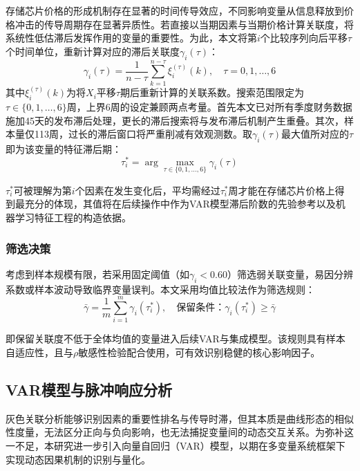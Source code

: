 \documentclass[a4paper,12pt,fontset=fandol]{ctexart}
\begin{document}
存储芯片价格的形成机制存在显著的时间传导效应，不同影响变量从信息释放到价格冲击的传导周期存在显著异质性。若直接以当期因素与当期价格计算关联度，将系统性低估滞后发挥作用的变量的重要性。为此，本文将第$i$个比较序列向后平移$\tau$个时间单位，重新计算对应的滞后关联度$\gamma_i(\tau)$：
\begin{equation}
\gamma_i(\tau) = \frac{1}{n-\tau}\sum_{k=1}^{n-\tau}\xi_i^{(\tau)}(k),\quad \tau=0,1,\ldots,6
\end{equation}
其中$\xi_i^{(\tau)}(k)$为将$X_i$平移$\tau$期后重新计算的关联系数。搜索范围限定为$\tau\in\{0,1,\ldots,6\}$周，上界6周的设定兼顾两点考量。首先本文已对所有季度财务数据施加45天的发布滞后处理，更长的滞后搜索将与发布滞后机制产生重叠。其次，样本量仅113周，过长的滞后窗口将严重削减有效观测数。取$\gamma_i(\tau)$最大值所对应的$\tau$即为该变量的特征滞后期：
\begin{equation}
\tau_i^* = \arg\max_{\tau\in\{0,1,\ldots,6\}}\gamma_i(\tau)
\end{equation}

$\tau_i^*$可被理解为第$i$个因素在发生变化后，平均需经过$\tau_i^*$周才能在存储芯片价格上得到最充分的体现，其值将在后续操作中作为VAR模型滞后阶数的先验参考以及机器学习特征工程的构造依据。

\subsubsection{筛选决策}

考虑到样本规模有限，若采用固定阈值（如$\gamma_i<0.60$）筛选弱关联变量，易因分辨系数或样本波动导致临界变量误判。本文采用均值比较法作为筛选规则：
\begin{equation}
\bar{\gamma}=\frac{1}{m}\sum_{i=1}^{m}\gamma_i(\tau_i^*),\quad\text{保留条件：}\gamma_i(\tau_i^*)\geq\bar{\gamma}
\end{equation}

即保留关联度不低于全体均值的变量进入后续VAR与集成模型。该规则具有样本自适应性，且与$\rho$敏感性检验配合使用，可有效识别稳健的核心影响因子。

\subsection{VAR模型与脉冲响应分析}

灰色关联分析能够识别因素的重要性排名与传导时滞，但其本质是曲线形态的相似性度量，无法区分正向与负向影响，也无法捕捉变量间的动态交互关系。为弥补这一不足，本研究进一步引入向量自回归（VAR）模型，以期在多变量系统框架下实现动态因果机制的识别与量化。
\end{document}
